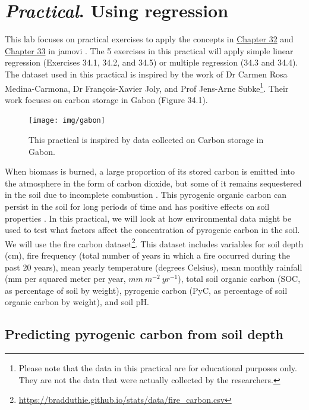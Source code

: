 \documentclass[
]{scrbook}
\begin{document}
\hypertarget{Chapter_34}{%
\chapter{\texorpdfstring{\emph{Practical}. Using regression}{Practical. Using regression}}\label{Chapter_34}}

This lab focuses on practical exercises to apply the concepts in \protect\hyperlink{Chapter_32}{Chapter 32} and \protect\hyperlink{Chapter_33}{Chapter 33} in jamovi \citep{Jamovi2022}.
The 5 exercises in this practical will apply simple linear regression (Exercises 34.1, 34.2, and 34.5) or multiple regression (34.3 and 34.4).
The dataset used in this practical is inspired by the work of Dr Carmen Rosa Medina-Carmona, Dr François-Xavier Joly, and Prof Jens-Arne Subke\footnote{Please note that the data in this practical are for educational purposes only. They are not the data that were actually collected by the researchers.}.
Their work focuses on carbon storage in Gabon (Figure 34.1).

\begin{figure}
\texttt{[image: img/gabon]} \caption{This practical is inspired by data collected on Carbon storage in Gabon.}\label{fig:unnamed-chunk-176}
\end{figure}

When biomass is burned, a large proportion of its stored carbon is emitted into the atmosphere in the form of carbon dioxide, but some of it remains sequestered in the soil due to incomplete combustion \citep{Santin2016}.
This pyrogenic organic carbon can persist in the soil for long periods of time and has positive effects on soil properties \citep{Reisser2016}.
In this practical, we will look at how environmental data might be used to test what factors affect the concentration of pyrogenic carbon in the soil.
We will use the fire carbon dataset\footnote{\url{https://bradduthie.github.io/stats/data/fire_carbon.csv}}.
This dataset includes variables for soil depth (cm), fire frequency (total number of years in which a fire occurred during the past 20 years), mean yearly temperature (degrees Celsius), mean monthly rainfall (mm per squared meter per year, \(mm\:m^{-2}\:yr^{-1}\)), total soil organic carbon (SOC, as percentage of soil by weight), pyrogenic carbon (PyC, as percentage of soil organic carbon by weight), and soil pH.

\hypertarget{predicting-pyrogenic-carbon-from-soil-depth}{%
\section{Predicting pyrogenic carbon from soil depth}\label{predicting-pyrogenic-carbon-from-soil-depth}}
\end{document}
